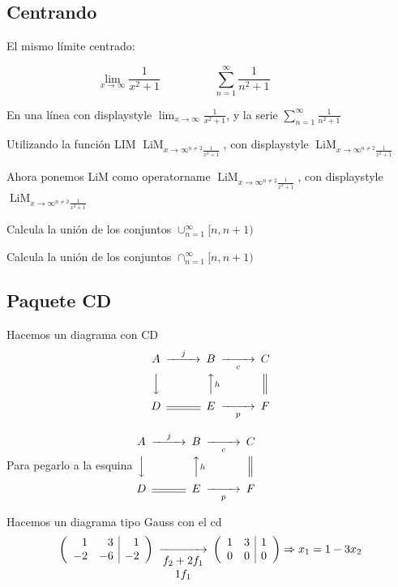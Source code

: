 \documentclass[10pt,a4paper]{article}
\DeclareMathOperator*{\limito}{LiM}
\begin{document}
\subsection{Centrando}

El mismo límite centrado:

\[
\lim_{x\to \infty}\frac{1}{x^2+1} \hspace{2cm} \sum_{n=1}^{\infty}\frac{1}{n^2+1}\hspace{2cm}
\]

En una línea con displaystyle $\displaystyle\lim_{x\to \infty}\frac{1}{x^2+1}$, y la serie $\displaystyle \sum_{n=1}^{\infty}\frac{1}{n^2+1}$

Utilizando la función LIM $\limito_{x\to \infty^{n\neq\dot{2}}\frac{1}{x^2+1}}$, con displaystyle $\displaystyle\limito_{x\to \infty^{n\neq\dot{2}}\frac{1}{x^2+1}}$

Ahora ponemos LiM como operatorname $\operatorname{LiM}_{x\to \infty^{n\neq\dot{2}}\frac{1}{x^2+1}}$, con displaystyle $\displaystyle\operatorname{LiM}_{x\to \infty^{n\neq\dot{2}}\frac{1}{x^2+1}}$

Calcula la unión de los conjuntos $\cup_{n=1}^{\infty} [n,n+1)$

Calcula la unión de los conjuntos $\cap_{n=1}^{\infty} [n,n+1)$

\subsection{Paquete CD}
Hacemos un diagrama con CD
\[
\begin{CD} 
	A @>j>> B @>>c> C \\
	@VVV @AAhA @| \\
	D @= E @>>p> F 
\end{CD}
\]

Para pegarlo a la esquina
$\displaystyle \begin{CD}
	A @>j>> B @>>c> C \\
	@VVV @AAhA @| \\
	D @= E @>>p> F 
\end{CD}$

Hacemos un diagrama tipo Gauss con el cd
\[
\begin{CD}
	\left(\begin{array}{rr|r}
		1&3&1\\
		-2&-6&-2
	\end{array}\right) @>>{\begin{matrix}
							f_2+2f_1\\1f_1
						\end{matrix}}>
	\left(\begin{array}{rr|r}
		1&3&1\\
		0&0&0
\end{array}\right) \Rightarrow x_1=1-3x_2
\end{CD}
\]
\end{document}
